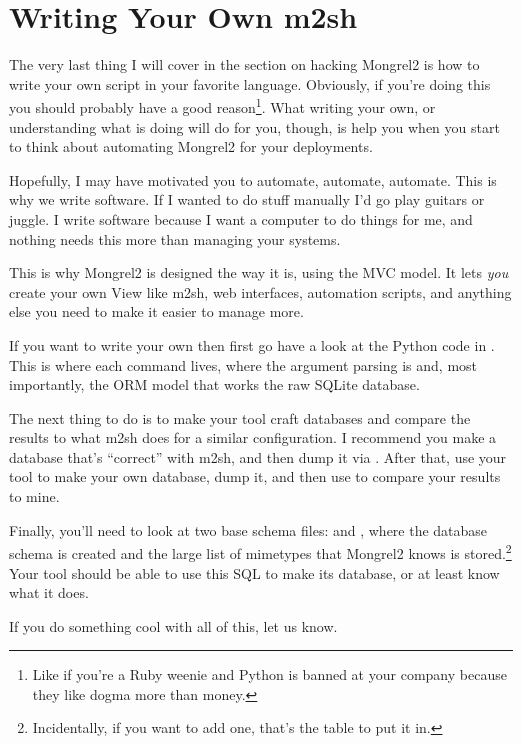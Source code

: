 \section{Writing Your Own m2sh}

The very last thing I will cover in the section on hacking Mongrel2 is how to
write your own  script in your favorite language.  Obviously, if
you're doing this you should probably have a good reason\footnote{Like if
you're a Ruby weenie and Python is banned at your company because they like
dogma more than money.}.  What writing your own, or understanding what
 is doing will do for you, though, is help you when you start to
think about automating Mongrel2 for your deployments.

Hopefully, I may have motivated you to automate, automate, automate.
This is why we write software.  If I wanted to do stuff manually I'd
go play guitars or juggle.  I write software because I want a computer
to do things for me, and nothing needs this more than managing your systems.

This is why Mongrel2 is designed the way it is, using the MVC model.  It
lets \emph{you} create your own View like m2sh, web interfaces, automation
scripts, and anything else you need to make it easier to manage more.

If you want to write your own  then first go have a look at
the Python code in .  This is where each
command lives, where the argument parsing is and, most importantly, the
ORM model that works the raw SQLite database.

The next thing to do is to make your tool craft databases and compare the
results to what m2sh does for a similar configuration.  I recommend you make
a database that's ``correct'' with m2sh, and then dump it via .
After that, use your tool to make your own database, dump it, and then use
 to compare your results to mine.

Finally, you'll need to look at two base schema files:
 and , where
the database schema is created and the large list of mimetypes that
Mongrel2 knows is stored.\footnote{Incidentally, if you want to add one,
that's the table to put it in.}  Your tool should be able to use this
SQL to make its database, or at least know what it does.

If you do something cool with all of this, let us know.
